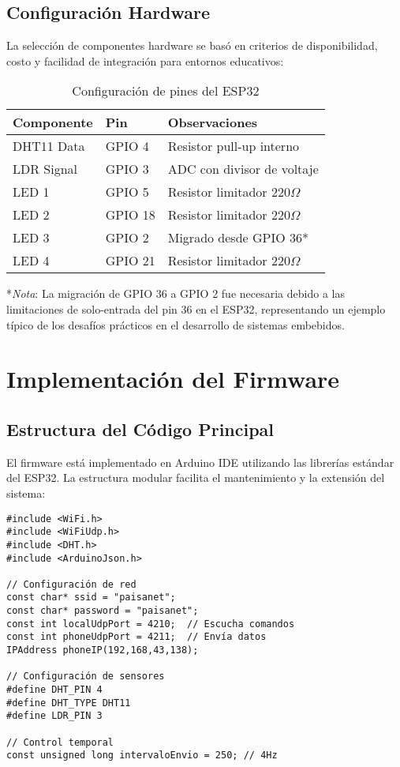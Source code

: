 \documentclass[conference,a4paper]{IEEEtran}
\begin{document}
\subsection{Configuraci\'on Hardware}

La selecci\'on de componentes hardware se bas\'o en criterios de disponibilidad, costo y facilidad de integraci\'on para entornos educativos:

\begin{table}[H]
\centering
\caption{Configuraci\'on de pines del ESP32}
\begin{tabular}{@{}lll@{}}
\toprule
\textbf{Componente} & \textbf{Pin} & \textbf{Observaciones} \\
\midrule
DHT11 Data & GPIO 4 & Resistor pull-up interno \\
LDR Signal & GPIO 3 & ADC con divisor de voltaje \\
LED 1 & GPIO 5 & Resistor limitador 220$\Omega$ \\
LED 2 & GPIO 18 & Resistor limitador 220$\Omega$ \\
LED 3 & GPIO 2 & Migrado desde GPIO 36* \\
LED 4 & GPIO 21 & Resistor limitador 220$\Omega$ \\
\bottomrule
\end{tabular}
\label{tab:pinout}
\end{table}

*\textit{Nota}: La migraci\'on de GPIO 36 a GPIO 2 fue necesaria debido a las limitaciones de solo-entrada del pin 36 en el ESP32, representando un ejemplo t\'ipico de los desaf\'ios pr\'acticos en el desarrollo de sistemas embebidos.

\section{Implementaci\'on del Firmware}

\subsection{Estructura del C\'odigo Principal}

El firmware est\'a implementado en Arduino IDE utilizando las librer\'ias est\'andar del ESP32. La estructura modular facilita el mantenimiento y la extensi\'on del sistema:

\begin{lstlisting}[style=arduino, caption=Configuraci\'on inicial del sistema]
#include <WiFi.h>
#include <WiFiUdp.h>
#include <DHT.h>
#include <ArduinoJson.h>

// Configuración de red
const char* ssid = "paisanet";
const char* password = "paisanet";
const int localUdpPort = 4210;  // Escucha comandos
const int phoneUdpPort = 4211;  // Envía datos
IPAddress phoneIP(192,168,43,138);

// Configuración de sensores
#define DHT_PIN 4
#define DHT_TYPE DHT11
#define LDR_PIN 3

// Control temporal
const unsigned long intervaloEnvio = 250; // 4Hz
\end{lstlisting}
\end{document}
